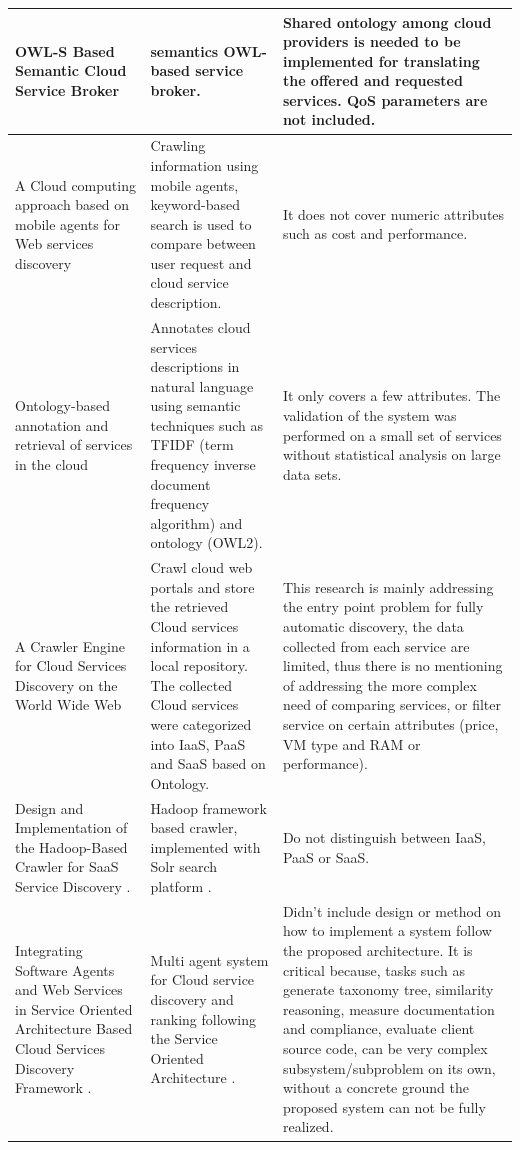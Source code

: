 \begin{longtable}{ p{30mm} | p{50mm} | p{50mm} }
\hline
	OWL-S Based Semantic Cloud Service Broker \cite{OWL-CloudServiceBroker}&
    semantics OWL-based service broker.&
    Shared ontology among cloud providers is needed to be implemented for translating the offered and requested services. QoS parameters are not included.\\
\hline
    A Cloud computing approach based on mobile agents for Web services discovery
    \cite{MobileAgentsWebServicesDiscovery}&
    Crawling information using mobile agents, keyword-based search is used to compare between user request and cloud service description.& 
    It does not cover numeric attributes such as cost and performance.\\
\hline
    Ontology-based annotation and retrieval of services in the cloud \cite{Ontology-basedAnnotationRetrievalOfServicesInCloud}&
    Annotates cloud services descriptions in natural language using semantic techniques such as TFIDF (term frequency inverse document frequency algorithm) and ontology (OWL2).&
    It only covers a few attributes. The validation of the system was performed on a small set of services without statistical analysis on large data sets.\\
\hline
	A Crawler Engine for Cloud Services Discovery on the World Wide Web \cite{CSCE} &
    Crawl cloud web portals and store the retrieved Cloud services information in a local repository. The collected Cloud services were categorized into IaaS, PaaS and SaaS based on Ontology.&
    This research is mainly addressing the entry point problem for fully automatic discovery, the data collected from each service are limited, thus there is no mentioning of addressing the more complex need of comparing services, or filter service on certain attributes (price, VM type and RAM or performance).\\
\hline
	Design and Implementation of the Hadoop-Based Crawler for SaaS Service Discovery \cite{Hadoop-BasedCrawlerForSaaSDiscovery}.&
    Hadoop framework \cite{Hadoop} based crawler, implemented with Solr search platform \citet{ApacheSolr}.&
    Do not distinguish between IaaS, PaaS or SaaS. \\
\hline
	Integrating Software Agents and Web Services in Service Oriented Architecture Based Cloud Services Discovery Framework \cite{AgentSOAServicesDiscovery}.&
	Multi agent system for Cloud service discovery and ranking following the Service Oriented Architecture \cite{SOA}. &
    Didn't include design or method on how to implement a system follow the proposed architecture. It is critical because, tasks such as generate taxonomy tree, similarity reasoning, measure documentation and compliance, evaluate client source code, can be very complex subsystem/subproblem on its own, without a concrete ground the proposed system can not be fully realized.\\

\end{longtable}
